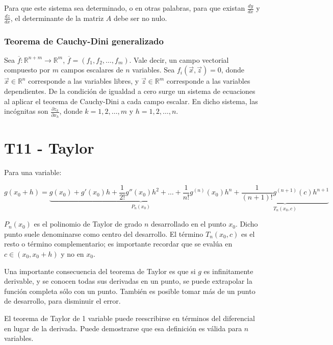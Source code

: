 \documentclass{article}
\renewcommand{\Bbb}{\mathbb}
\begin{document}
Para que este sistema sea determinado, o en otras palabras, para que existan $\frac{dy}{dx}$ y $\frac{dz}{dx}$, el determinante de la matriz $A$ debe ser no nulo.

\subsubsection{Teorema de Cauchy-Dini generalizado}

Sea $\overline{f}:\Bbb R^{n+m} \rightarrow \Bbb R^m$, $\overline{f} = (f_1, f_2, \ldots, f_m)$. Vale decir, un campo vectorial compuesto por $m$ campos escalares de $n$ variables. Sea $f_i(\overrightarrow{x}, \overrightarrow{z}) = 0$, donde $\overrightarrow{x} \in \Bbb R^n$ corresponde a las variables libres, y $\overrightarrow{z} \in \Bbb R^m$ corresponde a las variables dependientes. De la condición de igualdad a cero surge un sistema de ecuaciones al aplicar el teorema de Cauchy-Dini a cada campo escalar. En dicho sistema, las incógnitas son $\frac{\partial z_k}{\partial x_h}$, donde $k = 1, 2, \ldots, m$ y $h = 1, 2, \ldots, n$.

\section{T11 - Taylor}

Para una variable:

\begin{equation}
g(x_0 + h) = \underbrace{ g(x_0) + g'(x_0) h + \frac{1}{2!} g''(x_0) h^2 + \ldots + \frac{1}{n!} g^{(n)}(x_0) h^n }_{P_n(x_0)} +  \underbrace{ \frac{1}{(n+1)!} g^{(n+1)}(c) h^{n+1} }_{T_n(x_0, c)}
\end{equation}

$P_n(x_0)$ es el polinomio de Taylor de grado $n$ desarrollado en el punto $x_0$. Dicho punto suele denominarse como centro del desarrollo. El término $T_n(x_0, c)$ es el resto o término complementario; es importante recordar que se evalúa en $c \in (x_0, x_0 + h)$ y no en $x_0$.

Una importante consecuencia del teorema de Taylor es que si $g$ es infinitamente derivable, y se conocen todas sus derivadas en un punto, se puede extrapolar la función completa sólo con un punto. También es posible tomar más de un punto de desarrollo, para disminuir el error.

El teorema de Taylor de 1 variable puede reescribirse en términos del diferencial en lugar de la derivada. Puede demostrarse que esa definición es válida para $n$ variables.
\end{document}
